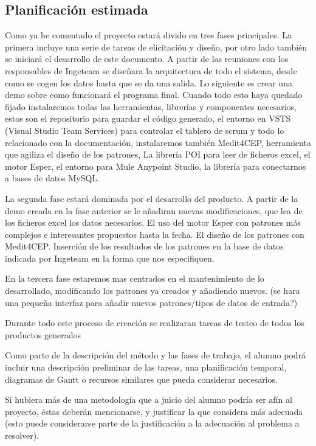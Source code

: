 \documentclass[a4paper]{article}
\begin{document}
\subsection{Planificación estimada}

Como ya he comentado el proyecto estará divido en tres fases principales. La primera incluye una serie de tareas de elicitación y diseño, por otro lado también se iniciará el desarrollo de este documento. A partir de las reuniones con los responsables de Ingeteam se diseñara la arquitectura de todo el sistema, desde como se cogen los datos hasta que se da una salida. Lo siguiente es crear una demo sobre como funcionará el programa final. Cuando todo esto haya quedado fijado instalaremos todas las herramientas, librerías y componentes necesarios, estos son el repositorio para guardar el código generado, el entorno en VSTS (Visual Studio Team Services) para controlar el tablero de scrum y todo lo relacionado con la documentación, instalaremos también Medit4CEP, herramienta que agiliza el diseño de los patrones, La librería POI para leer de ficheros excel, el motor Esper, el entorno para Mule Anypoint Studio, la librería para conectarnos a bases de datos MySQL.

La segunda fase estará dominada por el desarrollo del producto. A partir de la demo creada en la fase anterior se le añadiran nuevas modificaciones, que lea de los ficheros excel los datos necesarios. El uso del motor Esper con patrones más complejos e interesantes propuestos hasta la fecha. El diseño de los patrones con Medit4CEP. Inserción de los resultados de los patrones en la base de datos indicada por Ingeteam en la forma que nos especifiquen.

En la tercera fase estaremos mas centrados en el mantenimiento de lo desarrollado, modificando los patrones ya creados y añadiendo nuevos. (se hara una pequeña interfaz para añadir nuevos patrones/tipos de datos de entrada?)

Durante todo este proceso de creación se realizaran tareas de testeo de todos los productos generados

Como parte de la descripci\'on del m\'etodo y las fases de trabajo, el alumno podr\'a incluir una descripci\'on
preliminar de las tareas, una planificaci\'on temporal, diagramas de Gantt o recursos similares que pueda considerar
necesarios.

Si hubiera m\'as de una metodolog\'ia que a juicio del alumno podr\'ia ser af\'in al proyecto, \'estas deber\'an
mencionarse, y justificar la que considera m\'as adecuada (esto puede considerarse parte de la justificaci\'on a la
adecuaci\'on al problema a resolver).
\end{document}
